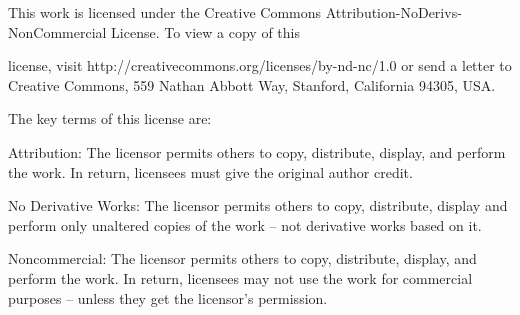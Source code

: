 \documentclass[a4paper,11pt]{book}
\begin{document}
\noindent  

\noindent  

\noindent  

\noindent  

\noindent 

\noindent 

\noindent 

\noindent This work is licensed under the Creative Commons Attribution-NoDerivs-NonCommercial License. To view a copy of this

\noindent license, visit http://creativecommons.org/licenses/by-nd-nc/1.0 or send a letter to Creative Commons, 559 Nathan Abbott Way, Stanford, California 94305, USA.

\noindent 

\noindent The key terms of this license are:

\noindent 

\noindent Attribution: The licensor permits others to copy, distribute, display, and perform the work. In return, licensees must give the original author credit.

\noindent 

\noindent No  Derivative  Works: The licensor permits others to copy, distribute, display and perform only unaltered copies of the work -- not derivative works based on it.

\noindent 

\noindent Noncommercial: The licensor permits others to copy, distribute, display, and perform the work. In return, licensees may not use the work for commercial purposes -- unless they get the licensor's permission.
\end{document}
